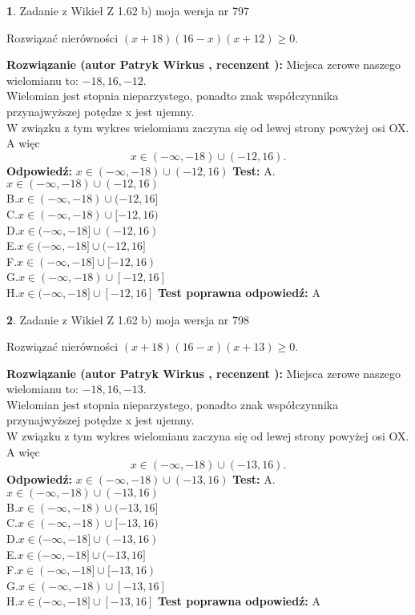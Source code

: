\documentclass[12pt, a4paper]{article}
\theoremstyle{definition} %
\newtheorem{zad}{}
\newcommand{\zadStart}[1]{\begin{zad}#1\newline}
\newcommand{\zadStop}{\end{zad}}
\newcommand{\rozwStart}[2]{\noindent \textbf{Rozwiązanie (autor #1 , recenzent #2): }\newline}
\newcommand{\rozwStop}{\newline}
\newcommand{\odpStart}{\noindent \textbf{Odpowiedź:}\newline}
\newcommand{\odpStop}{\newline}
\newcommand{\testStart}{\noindent \textbf{Test:}\newline}
\newcommand{\testStop}{\newline}
\newcommand{\kluczStart}{\noindent \textbf{Test poprawna odpowiedź:}\newline}
\newcommand{\kluczStop}{\newline}
\begin{document}
\zadStart{Zadanie z Wikieł Z 1.62 b) moja wersja nr 797}

Rozwiązać nierówności $(x+18)(16-x)(x+12)\ge0$.
\zadStop
\rozwStart{Patryk Wirkus}{}
Miejsca zerowe naszego wielomianu to: $-18, 16, -12$.\\
Wielomian jest stopnia nieparzystego, ponadto znak współczynnika przy\linebreak najwyższej potędze x jest ujemny.\\ W związku z tym wykres wielomianu zaczyna się od lewej strony powyżej osi OX. A więc $$x \in (-\infty,-18) \cup (-12,16).$$
\rozwStop
\odpStart
$x \in (-\infty,-18) \cup (-12,16)$
\odpStop
\testStart
A.$x \in (-\infty,-18) \cup (-12,16)$\\
B.$x \in (-\infty,-18) \cup (-12,16]$\\
C.$x \in (-\infty,-18) \cup [-12,16)$\\
D.$x \in (-\infty,-18] \cup (-12,16)$\\
E.$x \in (-\infty,-18] \cup (-12,16]$\\
F.$x \in (-\infty,-18] \cup [-12,16)$\\
G.$x \in (-\infty,-18) \cup [-12,16]$\\
H.$x \in (-\infty,-18] \cup [-12,16]$
\testStop
\kluczStart
A
\kluczStop



\zadStart{Zadanie z Wikieł Z 1.62 b) moja wersja nr 798}

Rozwiązać nierówności $(x+18)(16-x)(x+13)\ge0$.
\zadStop
\rozwStart{Patryk Wirkus}{}
Miejsca zerowe naszego wielomianu to: $-18, 16, -13$.\\
Wielomian jest stopnia nieparzystego, ponadto znak współczynnika przy\linebreak najwyższej potędze x jest ujemny.\\ W związku z tym wykres wielomianu zaczyna się od lewej strony powyżej osi OX. A więc $$x \in (-\infty,-18) \cup (-13,16).$$
\rozwStop
\odpStart
$x \in (-\infty,-18) \cup (-13,16)$
\odpStop
\testStart
A.$x \in (-\infty,-18) \cup (-13,16)$\\
B.$x \in (-\infty,-18) \cup (-13,16]$\\
C.$x \in (-\infty,-18) \cup [-13,16)$\\
D.$x \in (-\infty,-18] \cup (-13,16)$\\
E.$x \in (-\infty,-18] \cup (-13,16]$\\
F.$x \in (-\infty,-18] \cup [-13,16)$\\
G.$x \in (-\infty,-18) \cup [-13,16]$\\
H.$x \in (-\infty,-18] \cup [-13,16]$
\testStop
\kluczStart
A
\kluczStop
\end{document}
